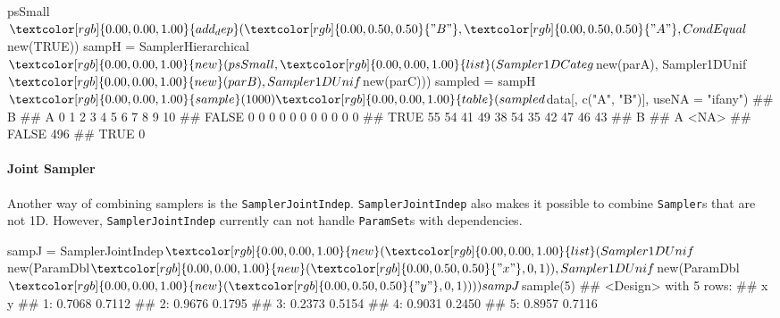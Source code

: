 \documentclass[
  11pt,
  parskip=half,
  DIV=calc,
  BCOR=10mm,
  x11names]{scrbook}
\newenvironment{Shaded}{}{}
\newcommand{\DataTypeTok}[1]{#1}
\newcommand{\DecValTok}[1]{#1}
\newcommand{\KeywordTok}[1]{\textcolor[rgb]{0.00,0.00,1.00}{#1}}
\newcommand{\NormalTok}[1]{#1}
\newcommand{\OperatorTok}[1]{#1}
\newcommand{\OtherTok}[1]{\textcolor[rgb]{1.00,0.25,0.00}{#1}}
\newcommand{\StringTok}[1]{\textcolor[rgb]{0.00,0.50,0.50}{#1}}
\begin{document}
\begin{Shaded}
\begin{Highlighting}[]
\NormalTok{psSmall}\OperatorTok{$}\KeywordTok{add_dep}\NormalTok{(}\StringTok{"B"}\NormalTok{, }\StringTok{"A"}\NormalTok{, CondEqual}\OperatorTok{$}\KeywordTok{new}\NormalTok{(}\OtherTok{TRUE}\NormalTok{))}
\NormalTok{sampH =}\StringTok{ }\NormalTok{SamplerHierarchical}\OperatorTok{$}\KeywordTok{new}\NormalTok{(psSmall, }\KeywordTok{list}\NormalTok{(Sampler1DCateg}\OperatorTok{$}\KeywordTok{new}\NormalTok{(parA), }
\NormalTok{  Sampler1DUnif}\OperatorTok{$}\KeywordTok{new}\NormalTok{(parB), Sampler1DUnif}\OperatorTok{$}\KeywordTok{new}\NormalTok{(parC)))}
\NormalTok{sampled =}\StringTok{ }\NormalTok{sampH}\OperatorTok{$}\KeywordTok{sample}\NormalTok{(}\DecValTok{1000}\NormalTok{)}
\KeywordTok{table}\NormalTok{(sampled}\OperatorTok{$}\NormalTok{data[, }\KeywordTok{c}\NormalTok{(}\StringTok{"A"}\NormalTok{, }\StringTok{"B"}\NormalTok{)], }\DataTypeTok{useNA =} \StringTok{"ifany"}\NormalTok{)}
\NormalTok{##        B}
\NormalTok{## A         0   1   2   3   4   5   6   7   8   9  10}
\NormalTok{##   FALSE   0   0   0   0   0   0   0   0   0   0   0}
\NormalTok{##   TRUE   55  54  41  49  38  54  35  42  47  46  43}
\NormalTok{##        B}
\NormalTok{## A       <NA>}
\NormalTok{##   FALSE  496}
\NormalTok{##   TRUE     0}
\end{Highlighting}
\end{Shaded}

\hypertarget{joint-sampler}{%
\paragraph{Joint Sampler}\label{joint-sampler}}

Another way of combining samplers is the \texttt{SamplerJointIndep}.
\texttt{SamplerJointIndep} also makes it possible to combine \texttt{Sampler}s that are not 1D.
However, \texttt{SamplerJointIndep} currently can not handle \texttt{ParamSet}s with dependencies.

\begin{Shaded}
\begin{Highlighting}[]
\NormalTok{sampJ =}\StringTok{ }\NormalTok{SamplerJointIndep}\OperatorTok{$}\KeywordTok{new}\NormalTok{(}\KeywordTok{list}\NormalTok{(Sampler1DUnif}\OperatorTok{$}\KeywordTok{new}\NormalTok{(ParamDbl}\OperatorTok{$}\KeywordTok{new}\NormalTok{(}\StringTok{"x"}\NormalTok{, }
  \DecValTok{0}\NormalTok{, }\DecValTok{1}\NormalTok{)), Sampler1DUnif}\OperatorTok{$}\KeywordTok{new}\NormalTok{(ParamDbl}\OperatorTok{$}\KeywordTok{new}\NormalTok{(}\StringTok{"y"}\NormalTok{, }\DecValTok{0}\NormalTok{, }\DecValTok{1}\NormalTok{))))}
\NormalTok{sampJ}\OperatorTok{$}\KeywordTok{sample}\NormalTok{(}\DecValTok{5}\NormalTok{)}
\NormalTok{## <Design> with 5 rows:}
\NormalTok{##         x      y}
\NormalTok{## 1: 0.7068 0.7112}
\NormalTok{## 2: 0.9676 0.1795}
\NormalTok{## 3: 0.2373 0.5154}
\NormalTok{## 4: 0.9031 0.2450}
\NormalTok{## 5: 0.8957 0.7116}
\end{Highlighting}
\end{Shaded}
\end{document}
